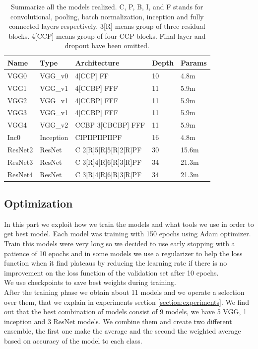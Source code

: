 \documentclass[10pt,twocolumn,letterpaper]{article}
\begin{document}
\begin{table}[]

   \scriptsize
   \begin{tabular}{L{0.8cm}C{0.6cm}C{3.4cm}C{0.6cm}C{0.8cm}}
      \hline
      Name    & Type      & Architecture         & Depth & Params \\
      \hline\hline
      VGG0    & VGG\_v0   & 4[CCP] FF            & 10    & 4.8m   \\
      VGG1    & VGG\_v1   & 4[CCBP] FFF          & 11    & 5.9m   \\
      VGG2    & VGG\_v1   & 4[CCBP] FFF          & 11    & 5.9m   \\
      VGG3    & VGG\_v1   & 4[CCBP] FFF          & 11    & 5.9m   \\
      VGG4    & VGG\_v2   & CCBP 3[CBCBP] FFF    & 11    & 5.9m   \\
      Inc0    & Inception & CIPIIPIIPIIPF        & 16    & 4.8m   \\
      ResNet2 & ResNet    & C 2[R]5[R]5[R]2[R]PF & 30    & 15.6m  \\
      ResNet3 & ResNet    & C 3[R]4[R]6[R]3[R]PF & 34    & 21.3m  \\
      ResNet4 & ResNet    & C 3[R]4[R]6[R]3[R]PF & 34    & 21.3m  \\
      \hline
   \end{tabular}
   \label{model:stable}
   \caption{Summarize all the models realized. C, P, B, I, and F stands for convolutional, pooling, batch normalization, inception and fully connected layers respectively. 3[R] means group of three residual blocks. 4[CCP] means group of four CCP blocks. Final layer and dropout have been omitted.}

\end{table}

\subsection{Optimization}
In this part we exploit how we train the models and what tools we use in order to get best model. Each model was training with 150 epochs using Adam optimizer. Train this models were very long so we decided to use early stopping with a patience of 10 epochs and in some models we use a regularizer to help the loss function when it find plateaus by reducing the learning rate if there is no improvement on the loss function of the validation set after 10 epochs.\\
We use checkpoints to save best weights during training.\\
After the training phase we obtain about 11 models and we operate a selection over them, that we explain in experiments section \ref{section:experiments}. We find out that the best combination of models consist of 9 models, we have 5 VGG, 1 inception and 3 ResNet models. We combine them and create two different ensemble, the first one make the average and the second the weighted average based on accuracy of the model to each class.
\end{document}
